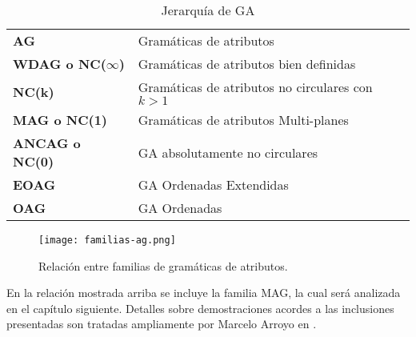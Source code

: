 \begin{table}[!ht]\centering
\begin{tabular}{ll}
\textbf{AG}         & Gramáticas de atributos \\
\textbf{WDAG o NC($\infty$)}       & Gramáticas de atributos bien definidas\\
\textbf{NC(k)}       & Gramáticas de atributos no circulares con $k > 1$\\
\textbf{MAG o NC(1)}       & Gramáticas de atributos Multi-planes\\
\textbf{ANCAG o NC(0)}      & GA absolutamente no circulares \\
\textbf{EOAG}       & GA Ordenadas Extendidas \\
\textbf{OAG}        & GA Ordenadas \\
\end{tabular}
\caption{Jerarquía de GA}
\label{jer-GA}
\end{table}

\begin{figure}\centering
\texttt{[image: familias-ag.png]}
\caption{\label{jer-GA2}Relación entre familias de gramáticas de atributos.} 
\end{figure}

En la relación mostrada arriba se incluye la familia MAG, la cual será analizada en el capítulo siguiente.
Detalles sobre demostraciones acordes a las inclusiones presentadas son tratadas ampliamente por Marcelo Arroyo en \cite{tesismarcelo}.